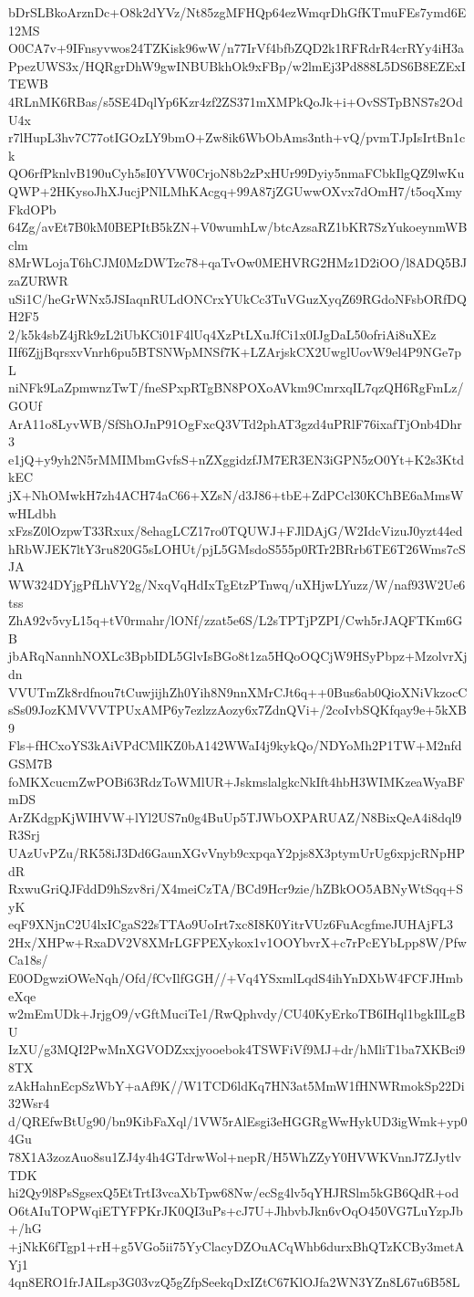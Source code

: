bDrSLBkoArznDc+O8k2dYVz/Nt85zgMFHQp64ezWmqrDhGfKTmuFEs7ymd6E12MS
O0CA7v+9IFnsyvwos24TZKisk96wW/n77IrVf4bfbZQD2k1RFRdrR4crRYy4iH3a
PpezUWS3x/HQRgrDhW9gwINBUBkhOk9xFBp/w2lmEj3Pd888L5DS6B8EZExITEWB
4RLnMK6RBas/s5SE4DqlYp6Kzr4zf2ZS371mXMPkQoJk+i+OvSSTpBNS7s2OdU4x
r7lHupL3hv7C77otIGOzLY9bmO+Zw8ik6WbObAms3nth+vQ/pvmTJpIsIrtBn1ck
QO6rfPknlvB190uCyh5sI0YVW0CrjoN8b2zPxHUr99Dyiy5nmaFCbkIlgQZ9lwKu
QWP+2HKysoJhXJucjPNlLMhKAcgq+99A87jZGUwwOXvx7dOmH7/t5oqXmyFkdOPb
64Zg/avEt7B0kM0BEPItB5kZN+V0wumhLw/btcAzsaRZ1bKR7SzYukoeynmWBclm
8MrWLojaT6hCJM0MzDWTzc78+qaTvOw0MEHVRG2HMz1D2iOO/l8ADQ5BJzaZURWR
uSi1C/heGrWNx5JSIaqnRULdONCrxYUkCc3TuVGuzXyqZ69RGdoNFsbORfDQH2F5
2/k5k4sbZ4jRk9zL2iUbKCi01F4lUq4XzPtLXuJfCi1x0IJgDaL50ofriAi8uXEz
IIf6ZjjBqrsxvVnrh6pu5BTSNWpMNSf7K+LZArjskCX2UwglUovW9el4P9NGe7pL
niNFk9LaZpmwnzTwT/fneSPxpRTgBN8POXoAVkm9CmrxqIL7qzQH6RgFmLz/GOUf
ArA11o8LyvWB/SfShOJnP91OgFxcQ3VTd2phAT3gzd4uPRlF76ixafTjOnb4Dhr3
e1jQ+y9yh2N5rMMIMbmGvfsS+nZXggidzfJM7ER3EN3iGPN5zO0Yt+K2s3KtdkEC
jX+NhOMwkH7zh4ACH74aC66+XZsN/d3J86+tbE+ZdPCcl30KChBE6aMmsWwHLdbh
xFzsZ0lOzpwT33Rxux/8ehagLCZ17ro0TQUWJ+FJlDAjG/W2IdcVizuJ0yzt44ed
hRbWJEK7ltY3ru820G5sLOHUt/pjL5GMsdoS555p0RTr2BRrb6TE6T26Wms7cSJA
WW324DYjgPfLhVY2g/NxqVqHdIxTgEtzPTnwq/uXHjwLYuzz/W/naf93W2Ue6tss
ZhA92v5vyL15q+tV0rmahr/lONf/zzat5e6S/L2sTPTjPZPI/Cwh5rJAQFTKm6GB
jbARqNannhNOXLc3BpbIDL5GlvIsBGo8t1za5HQoOQCjW9HSyPbpz+MzolvrXjdn
VVUTmZk8rdfnou7tCuwjijhZh0Yih8N9nnXMrCJt6q++0Bus6ab0QioXNiVkzocC
sSs09JozKMVVVTPUxAMP6y7ezlzzAozy6x7ZdnQVi+/2coIvbSQKfqay9e+5kXB9
Fls+fHCxoYS3kAiVPdCMlKZ0bA142WWaI4j9kykQo/NDYoMh2P1TW+M2nfdGSM7B
foMKXcucmZwPOBi63RdzToWMlUR+JskmslalgkcNkIft4hbH3WIMKzeaWyaBFmDS
ArZKdgpKjWIHVW+lYl2US7n0g4BuUp5TJWbOXPARUAZ/N8BixQeA4i8dql9R3Srj
UAzUvPZu/RK58iJ3Dd6GaunXGvVnyb9cxpqaY2pjs8X3ptymUrUg6xpjcRNpHPdR
RxwuGriQJFddD9hSzv8ri/X4meiCzTA/BCd9Hcr9zie/hZBkOO5ABNyWtSqq+SyK
eqF9XNjnC2U4lxICgaS22sTTAo9UoIrt7xc8I8K0YitrVUz6FuAcgfmeJUHAjFL3
2Hx/XHPw+RxaDV2V8XMrLGFPEXykox1v1OOYbvrX+c7rPcEYbLpp8W/PfwCa18s/
E0ODgwziOWeNqh/Ofd/fCvIlfGGH//+Vq4YSxmlLqdS4ihYnDXbW4FCFJHmbeXqe
w2mEmUDk+JrjgO9/vGftMuciTe1/RwQphvdy/CU40KyErkoTB6IHql1bgkIlLgBU
IzXU/g3MQI2PwMnXGVODZxxjyooebok4TSWFiVf9MJ+dr/hMliT1ba7XKBci98TX
zAkHahnEcpSzWbY+aAf9K//W1TCD6ldKq7HN3at5MmW1fHNWRmokSp22Di32Wsr4
d/QREfwBtUg90/bn9KibFaXql/1VW5rAlEsgi3eHGGRgWwHykUD3igWmk+yp04Gu
78X1A3zozAuo8su1ZJ4y4h4GTdrwWol+nepR/H5WhZZyY0HVWKVnnJ7ZJytlvTDK
hi2Qy9l8PsSgsexQ5EtTrtI3vcaXbTpw68Nw/ecSg4lv5qYHJRSlm5kGB6QdR+od
O6tAIuTOPWqiETYFPKrJK0QI3uPs+cJ7U+JhbvbJkn6vOqO450VG7LuYzpJb+/hG
+jNkK6fTgp1+rH+g5VGo5ii75YyClacyDZOuACqWhb6durxBhQTzKCBy3metAYj1
4qn8ERO1frJAILsp3G03vzQ5gZfpSeekqDxIZtC67KlOJfa2WN3YZn8L67u6B58L
